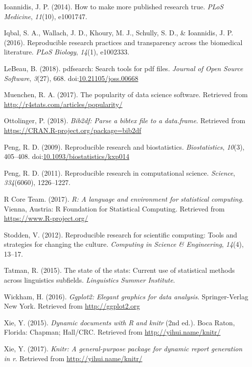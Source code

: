 \documentclass[english,,man]{apa6}
\begin{document}
\leavevmode\hypertarget{ref-ioannidis2014}{}%
Ioannidis, J. P. (2014). How to make more published research true. \emph{PLoS Medicine}, \emph{11}(10), e1001747.

\leavevmode\hypertarget{ref-iqbal2016}{}%
Iqbal, S. A., Wallach, J. D., Khoury, M. J., Schully, S. D., \& Ioannidis, J. P. (2016). Reproducible research practices and transparency across the biomedical literature. \emph{PLoS Biology}, \emph{14}(1), e1002333.

\leavevmode\hypertarget{ref-pdfsearch}{}%
LeBeau, B. (2018). pdfsearch: Search tools for pdf files. \emph{Journal of Open Source Software}, \emph{3}(27), 668. doi:\href{https://doi.org/10.21105/joss.00668}{10.21105/joss.00668}

\leavevmode\hypertarget{ref-muenchen}{}%
Muenchen, R. A. (2017). The popularity of data science software. Retrieved from \url{http://r4stats.com/articles/popularity/}

\leavevmode\hypertarget{ref-bib2df}{}%
Ottolinger, P. (2018). \emph{Bib2df: Parse a bibtex file to a data.frame}. Retrieved from \url{https://CRAN.R-project.org/package=bib2df}

\leavevmode\hypertarget{ref-peng2009}{}%
Peng, R. D. (2009). Reproducible research and biostatistics. \emph{Biostatistics}, \emph{10}(3), 405--408. doi:\href{https://doi.org/10.1093/biostatistics/kxp014}{10.1093/biostatistics/kxp014}

\leavevmode\hypertarget{ref-peng2011}{}%
Peng, R. D. (2011). Reproducible research in computational science. \emph{Science}, \emph{334}(6060), 1226--1227.

\leavevmode\hypertarget{ref-rpro}{}%
R Core Team. (2017). \emph{R: A language and environment for statistical computing}. Vienna, Austria: R Foundation for Statistical Computing. Retrieved from \url{https://www.R-project.org/}

\leavevmode\hypertarget{ref-stodden2012}{}%
Stodden, V. (2012). Reproducible research for scientific computing: Tools and strategies for changing the culture. \emph{Computing in Science \& Engineering}, \emph{14}(4), 13--17.

\leavevmode\hypertarget{ref-tatman2015}{}%
Tatman, R. (2015). The state of the stats: Current use of statistical methods across linguistics subfields. \emph{Linguistics Summer Institute}.

\leavevmode\hypertarget{ref-ggplot2}{}%
Wickham, H. (2016). \emph{Ggplot2: Elegant graphics for data analysis}. Springer-Verlag New York. Retrieved from \url{http://ggplot2.org}

\leavevmode\hypertarget{ref-knitr}{}%
Xie, Y. (2015). \emph{Dynamic documents with R and knitr} (2nd ed.). Boca Raton, Florida: Chapman; Hall/CRC. Retrieved from \url{http://yihui.name/knitr/}

\leavevmode\hypertarget{ref-knitrmanual}{}%
Xie, Y. (2017). \emph{Knitr: A general-purpose package for dynamic report generation in r}. Retrieved from \url{http://yihui.name/knitr/}
\end{document}
